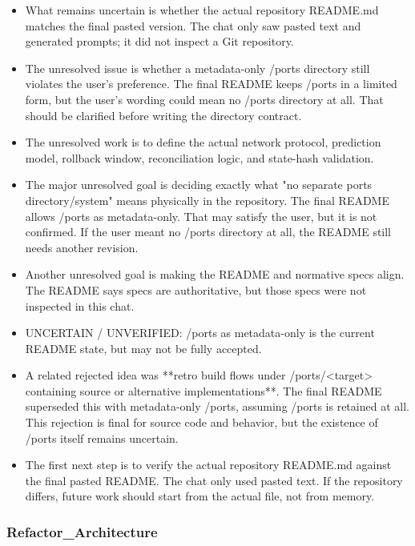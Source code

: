 \documentclass[11pt,a4paper]{report}
\begin{document}
\begin{itemize}
\item What remains uncertain is whether the actual repository README.md matches the final pasted version. The chat only saw pasted text and generated prompts; it did not inspect a Git repository.
\item The unresolved issue is whether a metadata-only /ports directory still violates the user's preference. The final README keeps /ports in a limited form, but the user's wording could mean no /ports directory at all. That should be clarified before writing the directory contract.
\item The unresolved work is to define the actual network protocol, prediction model, rollback window, reconciliation logic, and state-hash validation.
\item The major unresolved goal is deciding exactly what "no separate ports directory/system" means physically in the repository. The final README allows /ports as metadata-only. That may satisfy the user, but it is not confirmed. If the user meant no /ports directory at all, the README still needs another revision.
\item Another unresolved goal is making the README and normative specs align. The README says specs are authoritative, but those specs were not inspected in this chat.
\item UNCERTAIN / UNVERIFIED: /ports as metadata-only is the current README state, but may not be fully accepted.
\item A related rejected idea was **retro build flows under /ports/<target> containing source or alternative implementations**. The final README superseded this with metadata-only /ports, assuming /ports is retained at all. This rejection is final for source code and behavior, but the existence of /ports itself remains uncertain.
\item The first next step is to verify the actual repository README.md against the final pasted README. The chat only used pasted text. If the repository differs, future work should start from the actual file, not from memory.
\end{itemize}

\subsubsection{Refactor\_Architecture}
\end{document}
